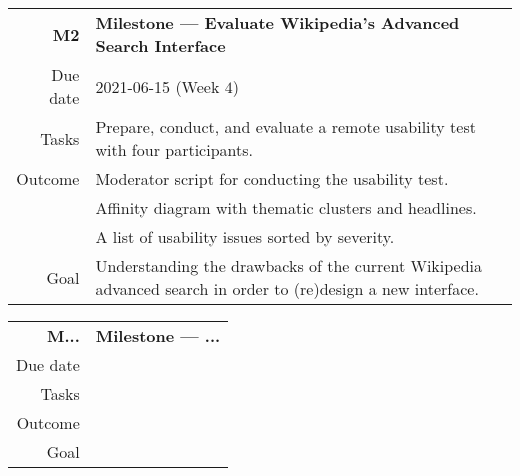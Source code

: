 \begin{table}[htbp]
\small
\colorbox{usethiscolorhere}{
\centering
\begin{tabularx}{\textwidth}{@{} r Y @{}}
	\textbf{M2}
	& \textbf{Milestone --- Evaluate Wikipedia's Advanced Search Interface}\vspace{2mm}\\
	Due date & 2021-06-15 (Week $4$)\vspace{2mm}\\
     Tasks & Prepare, conduct, and evaluate a remote usability test with four participants.\vspace{2mm}\\
    Outcome & Moderator script for conducting the usability test.\\
    & Affinity diagram with thematic clusters and headlines.\\
    & A list of usability issues sorted by severity.\vspace{2mm}\\
    Goal & Understanding the drawbacks of the current Wikipedia advanced search in order to (re)design a new interface.\vspace{2mm}\\
    
\end{tabularx}
}
\end{table}

\begin{table}[htbp]
\small
\colorbox{usethiscolorhere}{
\centering
\begin{tabularx}{\textwidth}{@{} r Y @{}}
	\textbf{M...}
	& \textbf{Milestone ---  ...}\vspace{2mm}\\
    Due date & \mbox{} \vspace{2mm}\\
    Tasks & \mbox{} \vspace{2mm}\\
    Outcome & \mbox{} \vspace{2mm}\\
    Goal & \mbox{} \vspace{2mm}\\
\end{tabularx}
}
\end{table}

